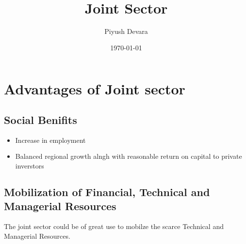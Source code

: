 \documentclass{article}
\title{Joint Sector}
\date{\today}
\author{Piyush Devara}
\begin{document}
\maketitle
{}

\section{Advantages of Joint sector} {
  \subsection{Social Benifits} {
	  \begin{itemize}
		  \item Increase in employment
		  \item Balanced regional growth alngh with reasonable return on capital to private inverstors
	  \end{itemize}
  }
  \subsection{Mobilization of Financial, Technical and Managerial Resources} {
	  The joint sector could be of great use to mobilze the scarce Technical and Managerial Resources.
  }
 }
\end{document}

